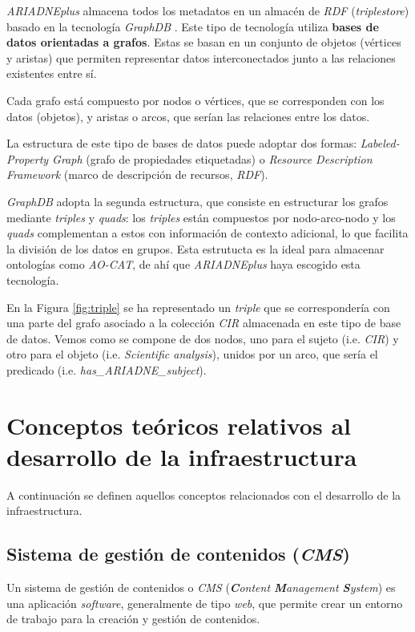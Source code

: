 \emph{ARIADNEplus} almacena todos los metadatos en un almacén de \emph{RDF}
(\emph{triplestore}) basado en la tecnología \emph{GraphDB} \cite{gdb:web}. 
Este tipo de tecnología utiliza \textbf{bases de datos orientadas a grafos}. Estas se
basan en un conjunto de objetos (vértices y aristas) que permiten
representar datos interconectados junto a las relaciones existentes
entre sí. 

Cada grafo está compuesto por nodos o vértices, que se
corresponden con los datos (objetos), y aristas o arcos, que serían las
relaciones entre los datos. 

La estructura de este tipo de bases de datos
puede adoptar dos formas: \emph{Labeled-Property Graph} (grafo de
propiedades etiquetadas) o \emph{Resource Description Framework} (marco
de descripción de recursos, \emph{RDF}).

\emph{GraphDB} adopta la segunda estructura, que consiste en estructurar los
grafos mediante \emph{triples} y \emph{quads}: los \emph{triples} están
compuestos por nodo-arco-nodo y los \emph{quads} complementan a estos
con información de contexto adicional, lo que facilita la división de
los datos en grupos. Esta estrutucta es la ideal para almacenar
ontologías como \emph{AO-CAT}, de ahí que \emph{ARIADNEplus} haya escogido esta
tecnología.


En la Figura \ref{fig:triple} se ha representado un \emph{triple} que se
correspondería con una parte del grafo asociado a la colección \emph{CIR}
almacenada en este tipo de base de datos. Vemos como se compone de dos
nodos, uno para el sujeto (i.e. \emph{CIR}) y otro para el objeto (i.e. \emph{Scientific
analysis}), unidos por un arco, que sería el predicado
(i.e. \emph{has\_ARIADNE\_subject}).

\section{Conceptos teóricos relativos al desarrollo de la infraestructura}

A continuación se definen aquellos conceptos relacionados con el
desarrollo de la infraestructura.

\subsection{Sistema de gestión de contenidos (\emph{CMS})}

Un sistema de gestión de contenidos o \emph{CMS} \cite{wiki:cms} (\emph{\textbf{C}ontent \textbf{M}anagement \textbf{S}ystem}) es una aplicación \emph{software}, generalmente de tipo \emph{web}, que permite crear un entorno de trabajo para la creación y gestión de contenidos. 

